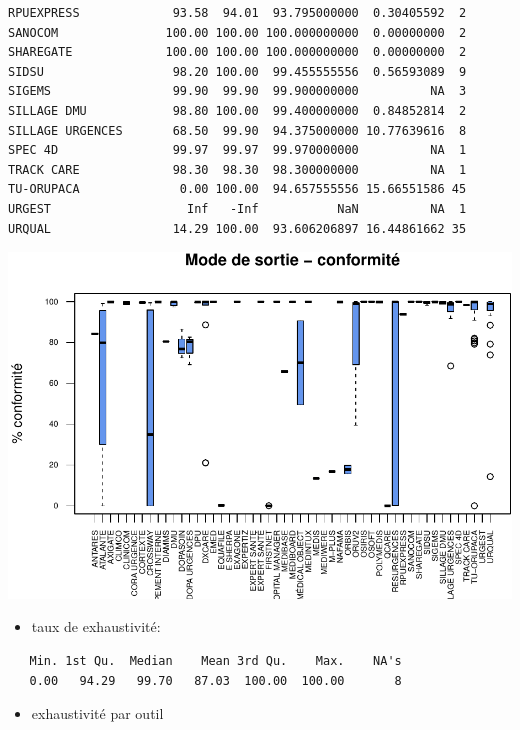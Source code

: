 \documentclass[]{article}
\begin{document}
\begin{verbatim}
RPUEXPRESS             93.58  94.01  93.795000000  0.30405592  2
SANOCOM               100.00 100.00 100.000000000  0.00000000  2
SHAREGATE             100.00 100.00 100.000000000  0.00000000  2
SIDSU                  98.20 100.00  99.455555556  0.56593089  9
SIGEMS                 99.90  99.90  99.900000000          NA  3
SILLAGE DMU            98.80 100.00  99.400000000  0.84852814  2
SILLAGE URGENCES       68.50  99.90  94.375000000 10.77639616  8
SPEC 4D                99.97  99.97  99.970000000          NA  1
TRACK CARE             98.30  98.30  98.300000000          NA  1
TU-ORUPACA              0.00 100.00  94.657555556 15.66551586 45
URGEST                   Inf   -Inf           NaN          NA  1
URQUAL                 14.29 100.00  93.606206897 16.44861662 35
\end{verbatim}

\includegraphics{septembre2015_files/figure-latex/unnamed-chunk-22-1.pdf}

\begin{itemize}
\itemsep1pt\parskip0pt
\item
  taux de exhaustivité:
\end{itemize}

\begin{verbatim}
   Min. 1st Qu.  Median    Mean 3rd Qu.    Max.    NA's 
   0.00   94.29   99.70   87.03  100.00  100.00       8 
\end{verbatim}

\begin{itemize}
\itemsep1pt\parskip0pt
\item
  exhaustivité par outil
\end{itemize}
\end{document}
